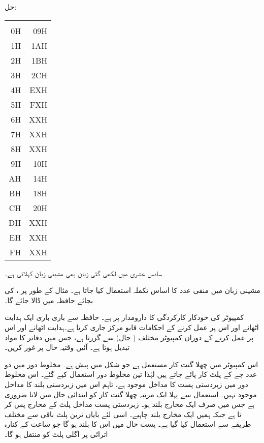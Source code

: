 حل:\quad
\begin{center}
\begin{tabular}{RR}
& \\[0.5ex]
0H&09H \\
1H&1AH\\
2H&1BH\\
3H&2CH\\
4H&EXH\\
5H&FXH\\
6H&XXH\\
7H&XXH\\
8H&XXH\\
9H&10H\\
AH&14H\\
BH&18H\\
CH&20H\\
DH&XXH\\
EH&XXH\\
FH&XXH
\end{tabular}
\end{center}
سادس عشری  میں لکھی گئی زبان بھی مشینی زبان کہلاتی ہے۔

  مشینی زبان میں منفی عدد کا اساس  تکملہ  استعمال کیا جاتا ہے۔ مثال کے طور پر ،   کی بجائے  حافظہ میں ڈالا جائے گا۔

کمپیوٹر کی خودکار کارکردگی کا دارومدار  پر ہے۔ حافظہ سے باری باری ایک  ہدایت    اٹھانے اور اس پر عمل کرنے  کے  احکامات قابو مرکز جاری کرتا ہے۔ہدایت  اٹھانے اور اس پر عمل کرنے کے دوران کمپیوٹر مختلف  ( حال)   سے گزرتا ہے، جس میں دفاتر  کا  مواد  تبدیل ہوتا ہے۔ آئیں وقتیہ حال پر غور کریں۔

اس کمپیوٹر میں  چھلا گنت کار  مستعمل ہے جو شکل  میں پیش ہے۔ مخلوط دور  میں دو عدد جے کے پلٹ کار  پائے جاتے ہیں لہٰذا تین مخلوط دور استعمال کیے گئے۔ اس  مخلوط دور میں زبردستی پست   کا مداخل موجود ہے، تاہم اس میں زبردستی بلند کا مداخل موجود نہیں۔  استعمال سے پہلا ایک مرتبہ  چھلا گنت کار کو ابتدائی حال میں لانا ضروری ہے جس میں صرف ایک مخارج بلند ہو۔  زبردستی پست مداخل پلٹ کے   مخارج پس کر تا ہے جبکہ ہمیں ایک مخارج بلند چاہیے۔ اسی لئے  بایاں ترین پلٹ باقی سے مختلف طریقے سے استعمال کیا گیا ہے۔ پست حال میں اس کا  بلند ہو گا جو ساعت کے کنارہ اترائی پر اگلی پلٹ کو منتقل ہو گا۔

